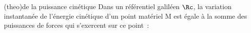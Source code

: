 \documentclass[../../main/main.tex]{subfiles}
\begin{document}

\begin{tcb*}(theo){de la puissance cinétique}
	Dans un référentiel galiléen $\Rc$, la variation instantanée de l'énergie
	cinétique d'un point matériel M est égale à la somme des puissances de
	forces qui s'exercent sur ce point~:
	\psw{
		\[\boxed{\dv{\Ec_c\Rg(\Mr)}{t} = \sum_i \Pc\Rg(\Ff_i)}\]
	}
	\vspace{-15pt}
\end{tcb*}
\end{document}
